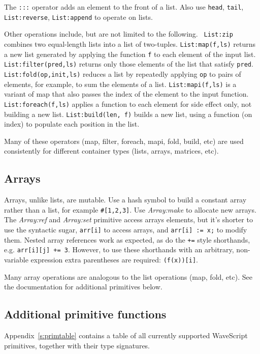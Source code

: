 \documentclass[twocolumn]{report}
\newcommand{\ws}{WaveScript}
\begin{document}
The {\tt :::} operator adds an element to the front of a list.  Also
use {\tt head}, {\tt tail}, {\tt List:reverse}, {\tt List:append} to operate on
lists.  

Other operations include, but are not limited to the following. {\tt
List:zip} combines two equal-length lists into a list of two-tuples.
{\tt List:map(f,ls)} returns a new list generated by applying the
function {\tt f} to each element of the input list.  {\tt
List:filter(pred,ls)} returns only those elements of the list that
satisfy {\tt pred}.  {\tt List:fold(op,init,ls)} reduces a list by
repeatedly applying {\tt op} to pairs of elements, for example, to sum
the elements of a list.  {\tt List:mapi(f,ls)} is a variant of map
that also passes the index of the element to the input function.  {\tt
List:foreach(f,ls)} applies a function to each element for side effect
only, not building a new list.  {\tt List:build(len, f)} builds a new
list, using a function (on index) to populate each position in the
list.

Many of these operators (map, filter, foreach, mapi, fold, build, etc) are used consistently
for different container types (lists, arrays, matrices, etc).

\subsection{Arrays}

Arrays, unlike lists, are mutable. 
Use a hash symbol to build a constant array rather than a list, for
example {{\tt \#[1,2,3]}}.
Use
{\em Array:make} to allocate new arrays.  The {\em Array:ref} and {\em Array:set}
primitive access arrays elements, but it's shorter to use the syntactic
sugar, {\tt arr[i]} to access arrays, and {\tt arr[i] := x;} to modify them.  Nested array references work as
expected, as do the {\tt +=} style shorthands, e.g. {\tt arr[i][j] += 3}.  
However, to use these shorthands with an arbitrary, non-variable
expression extra parentheses are required: {\tt (f(x))[i]}.

Many array operations are analogous to the list operations (map,
fold, etc).  See the documentation for additional primitives below.

\subsection{Additional primitive functions}

Appendix~\ref{s:primtable} contains a table of all currently supported
{\ws} primitives, together with their type signatures.
\end{document}
